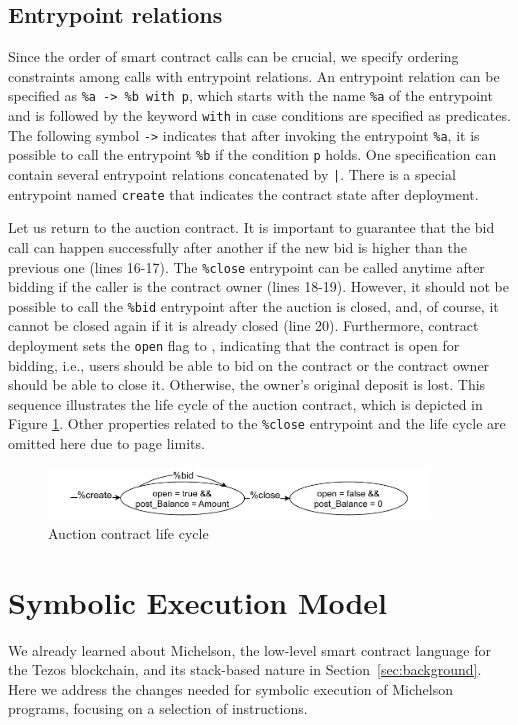 \documentclass[runningheads]{llncs}
\begin{document}
\subsection{Entrypoint relations}
\label{sec:entrypoint-relations}
Since the order of smart contract
calls can be crucial, we specify ordering constraints among calls with
 entrypoint relations. An entrypoint relation can be specified as
\lstinline/%a -> %b with p/, which starts with the name
\lstinline/%a/ of the entrypoint and is followed by the keyword
\lstinline/with/ in case conditions are specified as predicates. The
following symbol \lstinline/->/ indicates that after invoking the entrypoint \lstinline/%a/, it is possible  to call
the entrypoint \lstinline/%b/ if the condition \lstinline/p/ holds. One specification can contain several entrypoint relations concatenated by
\lstinline/|/. There is a special entrypoint named \lstinline/create/
that indicates the contract state after deployment. 

Let us return to the auction contract. It is important to guarantee
that  the bid call can happen successfully after another if the new bid is higher than the previous
one (lines 16-17). The  \lstinline/%close/ entrypoint can be called
anytime after bidding if the caller is the contract owner (lines 18-19). However, it
should not be possible to call the  \lstinline/%bid/ entrypoint after
the auction is closed, and, of course, it cannot be closed
again if it is already closed (line 20).  Furthermore, contract deployment sets the  \lstinline/open/ flag to
\TRUE, indicating that the contract is open for bidding, i.e., users
should be able to bid on the contract or the contract owner should be
able to close it. Otherwise, the owner's original
deposit is lost. This sequence  illustrates
the life cycle of the auction contract, which is depicted in Figure
\ref{fig:auction-life-cycle}. Other properties related to the \lstinline|%close| entrypoint and the life cycle are omitted here due to page limits.
\begin{figure}[tp]
    \centering
    \includegraphics[width=0.9\textwidth]{auction}
    \caption{Auction contract life cycle}
    \label{fig:auction-life-cycle}
\end{figure}

\section{Symbolic Execution Model}
\label{sec:symbolic-execution-model} 
We already learned about Michelson, the low-level smart contract
language for the Tezos blockchain, and its stack-based nature in
Section~\ref{sec:background}.  Here we address the changes needed for symbolic execution of Michelson programs, focusing on a selection of instructions. 
\end{document}
